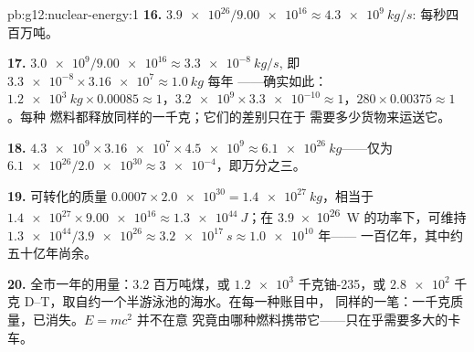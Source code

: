 \begin{solution}{pb:g12:nuclear-energy:1}
\textbf{16.} $\num{3.9e26}/\num{9.00e16} \approx \qty{4.3e9}{kg/s}$:
每秒四百万吨。

\textbf{17.} $\num{3.0e9}/\num{9.00e16} \approx \qty{3.3e-8}{kg/s}$,
即 $\num{3.3e-8} \times \num{3.16e7} \approx \qty{1.0}{kg}$ 每年
——确实如此：$\qty{1.2e3}{kg} \times 0.00085 \approx 1$，$\num{3.2e9}
\times \num{3.3e-10} \approx 1$，$280 \times 0.00375 \approx 1$。每种
燃料都释放同样的一千克；它们的差别只在于
需要多少货物来运送它。

\textbf{18.} $\num{4.3e9} \times \num{3.16e7} \times \num{4.5e9}
\approx \qty{6.1e26}{kg}$——仅为 $\num{6.1e26}/\num{2.0e30} \approx
\num{3e-4}$，即万分之三。

\textbf{19.} 可转化的质量 $0.0007 \times \num{2.0e30} =
\qty{1.4e27}{kg}$，相当于 $\num{1.4e27} \times \num{9.00e16} \approx
\qty{1.3e44}{J}$；在 \qty{3.9e26}{W} 的功率下，可维持 $\num{1.3e44}/
\num{3.9e26} \approx \qty{3.2e17}{s} \approx \num{1.0e10}$ 年——
一百亿年，其中约五十亿年尚余。

\textbf{20.} 全市一年的用量：$3.2$ 百万吨煤，或
$\num{1.2e3}$ 千克铀-235，或 $\num{2.8e2}$ 千克
D--T，取自约一个半游泳池的海水。在每一种账目中，
同样的一笔：一千克质量，已消失。$E = mc^2$ 并不在意
究竟由哪种燃料携带它——只在乎需要多大的卡车。
\end{solution}
